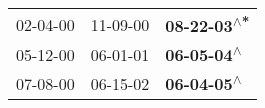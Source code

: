 \begin{supertabular}{lll}
 02-04-00\textsuperscript{} &  11-09-00\textsuperscript{} &  \textbf{08-22-03\textsuperscript{$\wedge$*}} \\
 05-12-00\textsuperscript{} &  06-01-01\textsuperscript{} &   \textbf{06-05-04\textsuperscript{$\wedge$}} \\
 07-08-00\textsuperscript{} &  06-15-02\textsuperscript{} &   \textbf{06-04-05\textsuperscript{$\wedge$}} \\
\end{supertabular}
